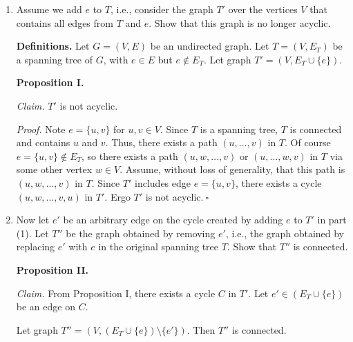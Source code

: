 \begin{enumerate}
\item Assume we add $e$ to $T$, i.e., consider the graph $T'$ over the vertices $V$ that contains all edges from $T$ and $e$. Show that this graph is no longer acyclic.
\begin{solution}

\textbf{Definitions. }Let $G=(V,E)$ be an undirected graph. Let $T=(V,E_T)$ be a spanning tree of $G$, with $e\in E$ but $e\notin E_T$. Let graph $T'=(V,E_T\cup\{e\})$. 

\textbf{Proposition I. }

\textit{Claim. }$T'$ is not acyclic.

\textit{Proof. }Note $e=\{u,v\}$ for $u,v\in V$. Since $T$ is a spanning tree, $T$ is connected and contains $u$ and $v$. Thus, there exists a path $(u,\dots,v)$ in $T$. Of course $e=\{u,v\}\notin E_T$, so there exists a path $(u,w,\dots,v)$ or $(u,\dots,w,v)$ in $T$ via some other vertex $w\in V$. Assume, without loss of generality, that this path is $(u,w,\dots,v)$ in $T$. Since $T'$ includes edge $e=\{u,v\}$, there exists a cycle $(u,w,\dots,v,u)$ in $T'$. Ergo $T'$ is not acyclic.$~\square$
\end{solution}
\item Now let $e'$ be an arbitrary edge on the cycle created by adding $e$ to $T'$ in part (1). Let $T''$ be the graph obtained by removing $e'$, i.e., the graph obtained by replacing $e'$ with $e$ in the original spanning tree $T$. Show that $T''$ is connected.
\begin{solution}

\textbf{Proposition II. }

\textit{Claim. }From Proposition I, there exists a cycle $C$ in $T'$. Let $e'\in(E_T\cup\{e\})$ be an edge on $C$.

Let graph $T''=(V,(E_T\cup\{e\})\setminus\{e'\})$. Then $T''$ is connected.


\end{solution}
\end{enumerate}
